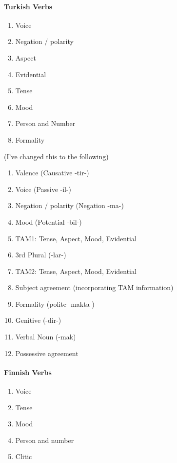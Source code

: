 \documentclass[11pt,letterpaper]{article}
\newcommand\mhahn[1]{{\color{red}(#1)}}
\begin{document}
\paragraph{Turkish Verbs}
\begin{enumerate}
    \item Voice
    \item Negation / polarity
    \item Aspect
    \item Evidential 
    \item Tense 
    \item Mood 
    \item Person and Number
    \item Formality
\end{enumerate}

\mhahn{I've changed this to the following}
\begin{enumerate}
    \item Valence (Causative -tir-)
    \item Voice (Passive -il-)
    \item Negation / polarity (Negation -ma-)
    \item Mood (Potential -bil-)
    \item TAM1: Tense, Aspect, Mood, Evidential
    \item 3rd Plural (-lar-)
    \item TAM2: Tense, Aspect, Mood, Evidential
    \item Subject agreement (incorporating TAM information)
    \item Formality (polite -makta-)
    \item Genitive (-dir-)
    \item Verbal Noun (-mak)
    \item Possessive agreement
\end{enumerate}




\paragraph{Finnish Verbs}
\begin{enumerate}
    \item Voice
    \item Tense 
    \item Mood 
    \item Person and number
    \item Clitic
\end{enumerate}
\end{document}

